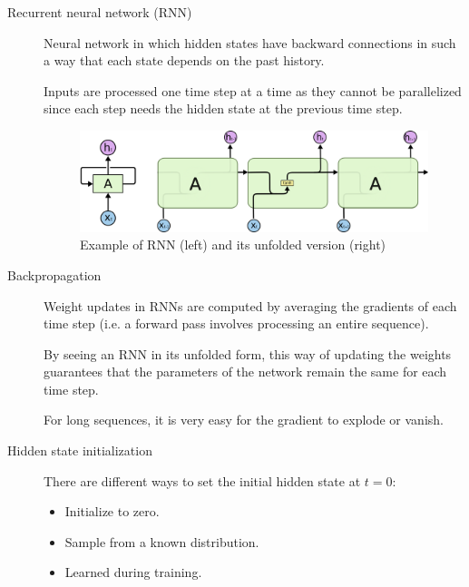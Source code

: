 \begin{description}
    \item[Recurrent neural network (RNN)] 
        Neural network in which hidden states have backward connections in such a way that each state depends on the past history.

        Inputs are processed one time step at a time as they cannot be parallelized since each step needs the hidden state at the previous time step.

        \begin{figure}[H]
            \centering
            \includegraphics[width=0.65\linewidth]{./img/rnn.png}
            \caption{Example of RNN (left) and its unfolded version (right)}
        \end{figure}

    \item[Backpropagation] 
        Weight updates in RNNs are computed by averaging the gradients of each time step (i.e. a forward pass involves processing an entire sequence).

        By seeing an RNN in its unfolded form, this way of updating the weights guarantees that the parameters of the network remain the same for each time step.

        \begin{remark}
            For long sequences, it is very easy for the gradient to explode or vanish.
        \end{remark}

    \item[Hidden state initialization] 
        There are different ways to set the initial hidden state at $t=0$:
        \begin{itemize}
            \item Initialize to zero.
            \item Sample from a known distribution.
            \item Learned during training.
        \end{itemize}
\end{description}



